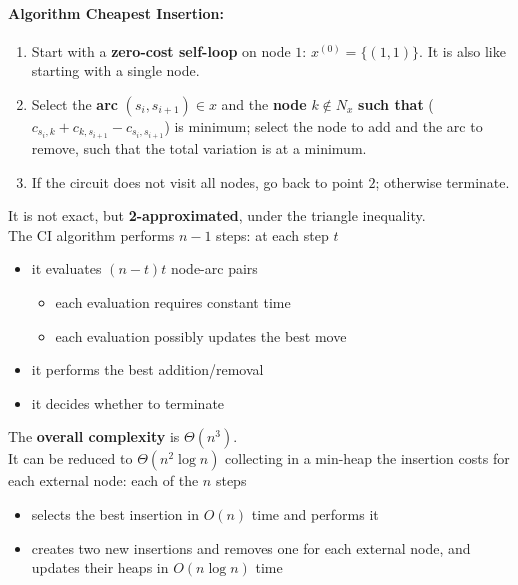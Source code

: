\documentclass[11pt]{article}
\begin{document}
	\newpage
	
	\paragraph{Algorithm Cheapest Insertion:}
	\begin{enumerate}
		\item Start with a \textbf{zero-cost self-loop} on node $1$: $x^{(0)} = \{(1, 1)\}$. It is also like starting with a single node.
		
		\item Select the \textbf{arc} $(s_i , s_{i+1}) \in x$ and the \textbf{node} $k \notin N_x$ \textbf{such that} ($c_{s_i, k} + c_{k, s_{i+1}} − c_{s_i ,s_{i+1}}$) is minimum; select the node to add and the arc to remove, such that the total variation is at a minimum.
		
		\item If the circuit does not visit all nodes, go back to point $2$; otherwise terminate.
	\end{enumerate}
	It is not exact, but \textbf{2-approximated}, under the triangle inequality.\\
	
	The CI algorithm performs $n - 1$ steps: at each step $t$
	\begin{itemize}
		\item it evaluates $(n - t) t$ node-arc pairs
		\begin{itemize}
			\item each evaluation requires constant time
			\item each evaluation possibly updates the best move
		\end{itemize}
		\item it performs the best addition/removal
		\item it decides whether to terminate
	\end{itemize}
	
	The \textbf{overall complexity} is $\Theta (n^3)$.\\
	
	It can be reduced to $\Theta (n^2 \log n)$ collecting in a min-heap the insertion costs for each external node: each of the $n$ steps
	\begin{itemize}
		\item selects the best insertion in $O (n)$ time and performs it
		\item creates two new insertions and removes one for each external node, and updates their heaps in $O (n \log n)$ time
	\end{itemize}
\end{document}
